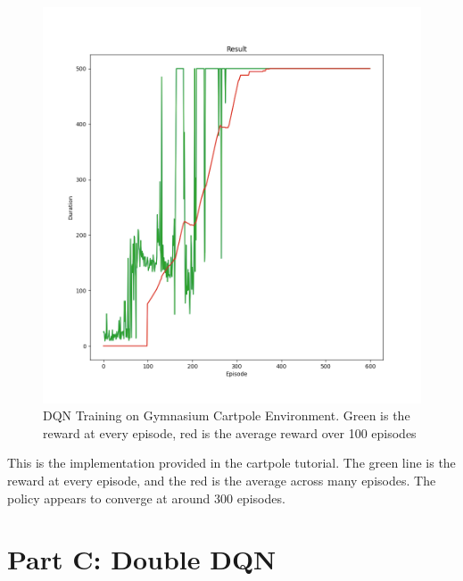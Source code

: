 \documentclass[10pt]{article}
\begin{document}
\begin{figure}[h!]
    \centering
    \includegraphics[scale=0.5]{cartpole_dqn_result.png}
    \caption{DQN Training on Gymnasium Cartpole Environment. Green is the reward at every episode, red is the average reward over 100 episodes}
\end{figure}

This is the implementation provided in the cartpole tutorial. The green line is the reward at every episode, and the red is the average across many episodes. The policy appears to converge at around 300 episodes.


\newpage

\section{Part C: Double DQN}
\end{document}
